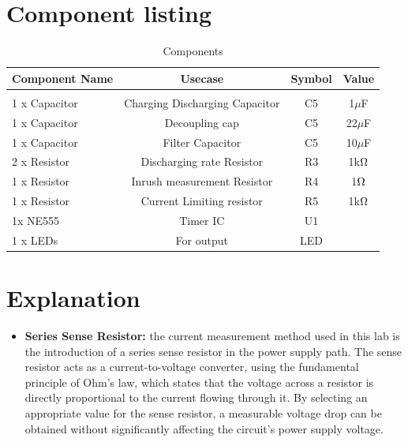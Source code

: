 \documentclass[a4paper,11pt]{article}%
\begin{document}
\section{Component listing}


\begin{table}[!h]
	\centering

	\begin{tabular}{l c c c}
		\hline
		\textbf{Component Name} & \textbf{Usecase}               & \textbf{Symbol} & \textbf{Value} \\\hline
		                        &                                &                                  \\
		1 x Capacitor           & Charging Discharging Capacitor & C5              & 1$\mu$F        \\
		1 x Capacitor           & Decoupling cap                 & C5              & 22$\mu$F       \\
		1 x Capacitor           & Filter Capacitor               & C5              & 10$\mu$F       \\
		2 x Resistor            & Discharging rate Resistor      & R3              & 1k$\ohm$       \\
		1 x Resistor            & Inrush measurement Resistor    & R4              & 1$\ohm$        \\
		1 x Resistor            & Current Limiting resistor      & R5              & 1k$\ohm$       \\
		1x NE555                & Timer IC                       & U1                               \\
		1 x LEDs                & For output                     & LED                              \\
		\hline\hline
	\end{tabular}
	\caption{Components}
\end{table}





\section{Explanation}

\begin{itemize}
	\item \textbf{Series Sense Resistor:} the current measurement method used in this lab is the introduction of a series sense resistor in the power supply path. The sense resistor acts as a current-to-voltage converter, using the fundamental principle of Ohm's law, which states that the voltage across a resistor is directly proportional to the current flowing through it. By selecting an appropriate value for the sense resistor, a measurable voltage drop can be obtained without significantly affecting the circuit's power supply voltage.
\end{itemize}
\end{document}
